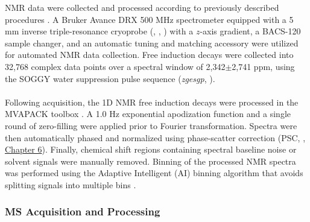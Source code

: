 \begin{doublespace}
NMR data were collected and processed according to previously described
procedures \cite{zhang:jiomic2013}. A Bruker Avance DRX 500 MHz spectrometer
equipped with a 5 mm inverse triple-resonance cryoprobe (\hnmr{}, \cnmr{},
\nnmr{}) with a $z$-axis gradient, a BACS-120 sample changer, and an automatic
tuning and matching accessory were utilized for automated NMR data collection.
Free induction decays were collected into 32,768 complex data points over a
spectral window of 2,342$\pm$2,741 ppm, using the SOGGY water suppression
pulse sequence (\emph{zgesgp}, \cite{hwang:jmr1995,nguyen:jmr2007}).
\\\\
Following acquisition, the 1D \hnmr{} NMR free induction decays were processed
in the MVAPACK toolbox \cite{worley:acscb2014}. A 1.0 Hz exponential
apodization function and a single round of zero-filling were applied prior to
Fourier transformation. Spectra were then automatically phased and normalized
using phase-scatter correction (PSC, \cite{worley:cils2014},
\hyperlink{chapter.6}{Chapter 6}). Finally, chemical shift regions
containing spectral baseline noise or solvent signals were manually removed.
Binning of the processed NMR spectra was performed using the Adaptive
Intelligent (AI) binning algorithm that avoids splitting signals into
multiple bins \cite{demeyer:anchem2008}.
\end{doublespace}

\subsubsection{MS Acquisition and Processing}

